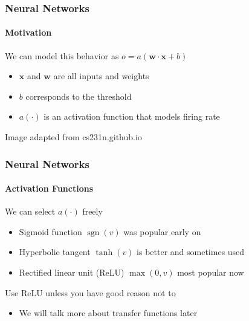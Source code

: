 \documentclass[xetex,professionalfont]{beamer}
\renewcommand\emph[1]{\textcolor{tuwcvl_cvl_blue}{#1}}
\renewcommand{\vec}[1]{\ensuremath{\mathbf{#1}}}
\newcommand{\vw}{\vec{w}}
\newcommand{\vx}{\vec{x}}
\DeclareMathOperator*{\sgn}{sgn}
\begin{document}
\begin{frame}
\frametitle{Neural Networks}
\framesubtitle{Motivation}

We can model this behavior as $o=a(\vw\cdot\vx+b)$
\begin{itemize}
    \item $\vx$ and $\vw$ are all inputs and weights
    \item $b$ corresponds to the threshold
    \item $a(\cdot)$ is an \emph{activation function} that models firing rate %
\end{itemize}

\smallskip

\begin{center}
    {\centering Image adapted from cs231n.github.io}
\end{center}

\end{frame}


\begin{frame}
\frametitle{Neural Networks}
\framesubtitle{Activation Functions}

We can select $a(\cdot)$ freely
\begin{itemize}
    \item \emph{Sigmoid function} $\sgn(v)$ was popular early on %
    \item \emph{Hyperbolic tangent} $\tanh(v)$ is better and sometimes used %
    \item \emph{Rectified linear unit} (\emph{ReLU}) $\max(0,v)$ most popular now %
\end{itemize}

\bigskip

Use ReLU unless you have good reason not to
\begin{itemize}
    \item We will talk more about transfer functions later
\end{itemize}

\end{frame}
\end{document}
